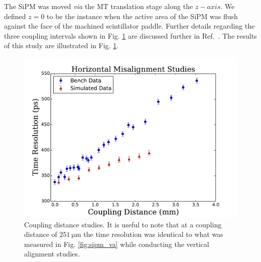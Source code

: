 The SiPM was moved \textit{via} the MT translation stage along the $z-axis$.  We defined $z = 0$ to be the instance when the active area of the SiPM was flush against the face of the machined scintillator paddle.  Further details regarding the three coupling intervals shown in Fig. \ref{fig:sipm_coupling} are discussed further in Ref.~\cite{pooser16}.  The results of this study are illustrated in Fig. \ref{fig:sipm_coupling}.
	\begin{figure}[!htb]
	\centering
	\includegraphics[width=1.0\columnwidth]{misalignment/figs/hori_ma_v2}
	\caption{Coupling distance studies.  It is useful to note that at a coupling distance of $\mathrm{251\ \mu m}$ the time resolution was identical to what was measured in Fig. \ref{fig:sipm_va} while conducting the vertical alignment studies.}
	\label{fig:sipm_coupling}
	\end{figure}

